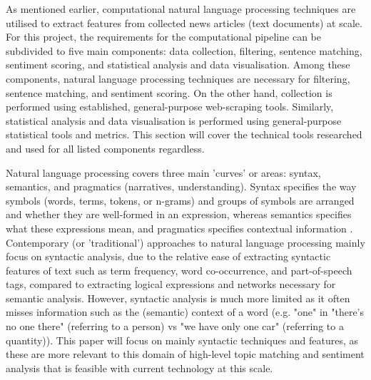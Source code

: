 \documentclass{report}
\begin{document}
As mentioned earlier, computational natural language processing techniques are utilised to extract features from collected news articles (text documents) at scale.
For this project, the requirements for the computational pipeline can be subdivided to five main components: data collection, filtering, sentence matching, sentiment scoring, and statistical analysis and data visualisation.
Among these components, natural language processing techniques are necessary for filtering, sentence matching, and sentiment scoring.
On the other hand, collection is performed using established, general-purpose web-scraping tools.
Similarly, statistical analysis and data visualisation is performed using general-purpose statistical tools and metrics.
This section will cover the technical tools researched and used for all listed components regardless.

Natural language processing covers three main 'curves' or areas:  syntax, semantics, and pragmatics (narratives, understanding). 
Syntax specifies the way symbols (words, terms, tokens, or n-grams) and groups of symbols are arranged and whether they are well-formed in an expression, whereas semantics specifies what these expressions mean, and pragmatics specifies contextual information \cite{cambria2014jumping}.
Contemporary (or 'traditional') approaches to natural language processing mainly focus on syntactic analysis, due to the relative ease of extracting syntactic features of text such as term frequency, word co-occurrence, and part-of-speech tags, compared to extracting logical expressions and networks necessary for semantic analysis.
However, syntactic analysis is much more limited as it often misses information such as the (semantic) context of a word (e.g. "one" in "there's no one there" (referring to a person) vs "we have only one car" (referring to a quantity)).
This paper will focus on mainly syntactic techniques and features, as these are more relevant to this domain of high-level topic matching and sentiment analysis that is feasible with current technology at this scale.
\end{document}
